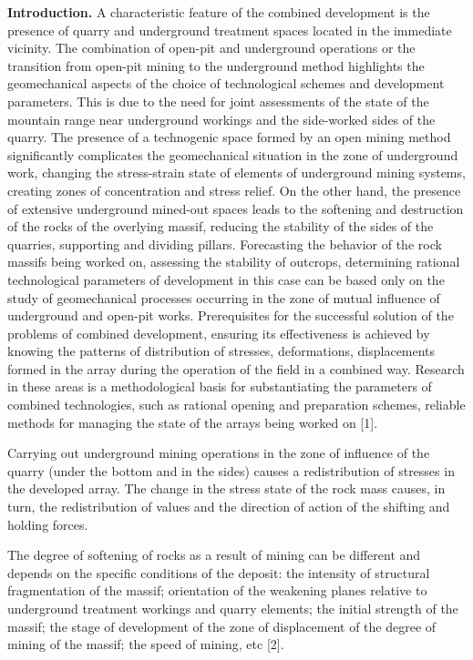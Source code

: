 \begin{multicols}{2}
{\bfseries Introduction.} A characteristic feature of the combined
development is the presence of quarry and underground treatment spaces
located in the immediate vicinity. The combination of open-pit and
underground operations or the transition from open-pit mining to the
underground method highlights the geomechanical aspects of the choice of
technological schemes and development parameters. This is due to the
need for joint assessments of the state of the mountain range near
underground workings and the side-worked sides of the quarry. The
presence of a technogenic space formed by an open mining method
significantly complicates the geomechanical situation in the zone of
underground work, changing the stress-strain state of elements of
underground mining systems, creating zones of concentration and stress
relief. On the other hand, the presence of extensive underground
mined-out spaces leads to the softening and destruction of the rocks of
the overlying massif, reducing the stability of the sides of the
quarries, supporting and dividing pillars. Forecasting the behavior of
the rock massifs being worked on, assessing the stability of outcrops,
determining rational technological parameters of development in this
case can be based only on the study of geomechanical processes occurring
in the zone of mutual influence of underground and open-pit works.
Prerequisites for the successful solution of the problems of combined
development, ensuring its effectiveness is achieved by knowing the
patterns of distribution of stresses, deformations, displacements formed
in the array during the operation of the field in a combined way.
Research in these areas is a methodological basis for substantiating the
parameters of combined technologies, such as rational opening and
preparation schemes, reliable methods for managing the state of the
arrays being worked on {[}1{]}.

Carrying out underground mining operations in the zone of influence of
the quarry (under the bottom and in the sides) causes a redistribution
of stresses in the developed array. The change in the stress state of
the rock mass causes, in turn, the redistribution of values and the
direction of action of the shifting and holding forces.

The degree of softening of rocks as a result of mining can be different
and depends on the specific conditions of the deposit: the intensity of
structural fragmentation of the massif; orientation of the weakening
planes relative to underground treatment workings and quarry elements;
the initial strength of the massif; the stage of development of the zone
of displacement of the degree of mining of the massif; the speed of
mining, etc {[}2{]}.


\end{multicols}
